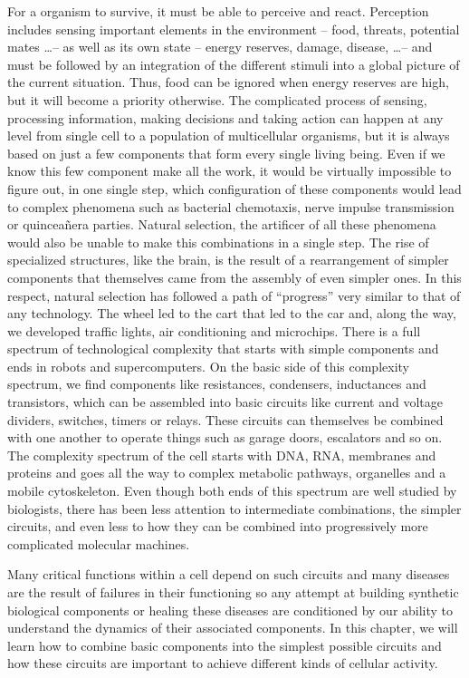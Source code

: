 For a organism to survive, it must be able to perceive and react. Perception includes sensing important elements in the environment -- food, threats, potential mates \dots -- as well as its own state -- energy reserves, damage, disease, \dots -- and must be followed by an integration of the different stimuli into a global picture of the current situation. Thus, food can be ignored when energy reserves are high, but it will become a priority otherwise. The complicated process of sensing, processing information, making decisions and taking action can happen at any level from single cell to a population of multicellular organisms, but it is always based on just a few components that form every single living being. Even if we know this few component make all the work, it would be virtually impossible to figure out, in one single step, which configuration of these components would lead to complex phenomena such as bacterial chemotaxis, nerve impulse transmission or quincea\~nera parties. Natural selection, the artificer of all these phenomena would also be unable to make this combinations in a single step.  The rise of specialized structures, like the brain, is the result of a rearrangement of simpler components that themselves came from the assembly of even simpler ones. In this respect, natural selection has followed a path of ``progress'' very similar to that of any technology. The wheel led to the cart that led to the car and, along the way, we developed traffic lights, air conditioning and microchips. There is a full spectrum of technological complexity that starts with simple components and ends in robots and supercomputers. On the basic side of this complexity spectrum, we find components like resistances, condensers, inductances and transistors, which can be assembled into basic circuits like current and voltage dividers, switches, timers or relays. These circuits can themselves be combined with one another to operate things such as garage doors, escalators and so on. The complexity spectrum of the cell starts with DNA, RNA, membranes and proteins and goes all the way to complex metabolic pathways, organelles and a mobile cytoskeleton. Even though both ends of this spectrum are well studied by biologists, there has been less attention to intermediate combinations, the simpler circuits, and even less to how they can be combined into progressively more complicated molecular machines.

Many critical functions within a cell depend on such circuits and many diseases are the result of failures in their functioning so any attempt at building synthetic biological components or healing these diseases are conditioned by our ability to understand the dynamics of their associated components. In this chapter, we will learn how to combine basic components into the simplest possible circuits and how these circuits are important to achieve different kinds of cellular activity.

